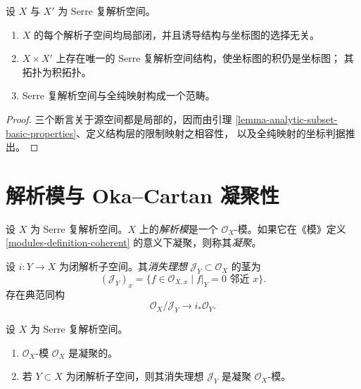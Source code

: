 \begin{lemma}
\label{lemma-serre-analytic-subspaces-products}
\begin{reference}
\cite[\S 1，第 2 号，第 5 页]{GAGA}
\end{reference}
设 $X$ 与 $X'$ 为 Serre 复解析空间。
\begin{enumerate}
\item $X$ 的每个解析子空间均局部闭，并且诱导结构与坐标图的选择无关。
\item $X\times X'$ 上存在唯一的 Serre 复解析空间结构，使坐标图的积仍是坐标图；
其拓扑为积拓扑。
\item Serre 复解析空间与全纯映射构成一个范畴。
\end{enumerate}
\end{lemma}

\begin{proof}
三个断言关于源空间都是局部的，因而由引理
\ref{lemma-analytic-subset-basic-properties}、定义结构层的限制映射之相容性，
以及全纯映射的坐标判据推出。
\end{proof}


\section{解析模与 Oka--Cartan 凝聚性}
\label{section-analytic-modules}

\begin{definition}
\label{definition-analytic-module}
\begin{reference}
\cite[\S 1，第 3 号，第 5 页]{GAGA}
\end{reference}
设 $X$ 为 Serre 复解析空间。$X$ 上的{\it 解析模}是一个
$\mathcal O_X$-模。如果它在《模》定义 \ref{modules-definition-coherent}
的意义下凝聚，则称其{\it 凝聚}。
\end{definition}

\begin{definition}
\label{definition-vanishing-ideal-analytic-subspace}
设 $i:Y\to X$ 为闭解析子空间。其{\it 消失理想}
$\mathcal J_Y\subset\mathcal O_X$ 的茎为
$$
(\mathcal J_Y)_x=
\{f\in\mathcal O_{X,x}\mid f|_Y=0\text{ 邻近 }x\}.
$$
存在典范同构
$$
\mathcal O_X/\mathcal J_Y \longrightarrow i_*\mathcal O_Y.
$$
\end{definition}

\begin{theorem}
\label{theorem-oka-cartan-coherence}
\begin{reference}
\cite[\S 1，命题 1，第 5--6 页]{GAGA}
\end{reference}
设 $X$ 为 Serre 复解析空间。
\begin{enumerate}
\item $\mathcal O_X$-模 $\mathcal O_X$ 是凝聚的。
\item 若 $Y\subset X$ 为闭解析子空间，则其消失理想 $\mathcal J_Y$
是凝聚 $\mathcal O_X$-模。
\end{enumerate}
\end{theorem}


